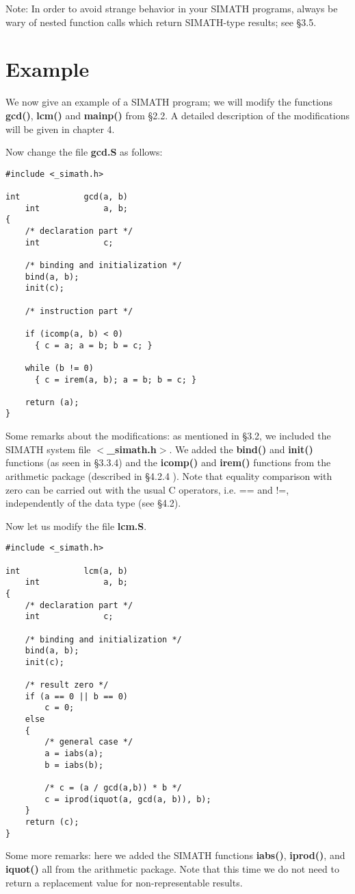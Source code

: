 Note: In order to avoid strange behavior in your SIMATH programs, always
be wary of nested function calls which return SIMATH-type results; see \S 3.5.



\newpage
\section{Example}
We now give an example of a SIMATH program; we will modify the functions {\bf gcd()},
{\bf lcm()} and {\bf mainp()} from \S 2.2. A detailed description of the modi\-fi\-ca\-tions
will be given in chapter 4.

Now change the file {\bf gcd.S} as follows:
\begin{verbatim}
#include <_simath.h>

int             gcd(a, b)
    int             a, b;
{
    /* declaration part */
    int             c;

    /* binding and initialization */
    bind(a, b);
    init(c);

    /* instruction part */

    if (icomp(a, b) < 0)
      { c = a; a = b; b = c; }

    while (b != 0)
      { c = irem(a, b); a = b; b = c; }

    return (a);
}
\end{verbatim}
Some remarks about the modi\-fi\-ca\-tions: as mentioned in \S 3.2, we included
the SIMATH system file {\bf $<$\_simath.h$>$}. We added the {\bf bind()} and
{\bf init()} functions (as seen in \S 3.3.4) and the {\bf icomp()}  and  {\bf irem()}
functions from the arithmetic package (described in \S 4.2.4 ). Note that equality
comparison with zero can be carried out with the usual C operators, i.e. == and !=,
independently of the data type (see \S 4.2).

\newpage

Now let us modify the file {\bf lcm.S}.
\begin{verbatim} 
#include <_simath.h>

int             lcm(a, b)
    int             a, b;
{
    /* declaration part */
    int             c;

    /* binding and initialization */
    bind(a, b);
    init(c);

    /* result zero */
    if (a == 0 || b == 0)
        c = 0;
    else
    {
        /* general case */
        a = iabs(a);
        b = iabs(b);

        /* c = (a / gcd(a,b)) * b */
        c = iprod(iquot(a, gcd(a, b)), b);
    }
    return (c);
}
\end{verbatim}  
Some more remarks: here we added the SIMATH functions {\bf iabs()}, {\bf iprod()}, and
{\bf iquot()} all from the arithmetic package. Note that this time we do not need
to return a replacement value for non-representable results.

